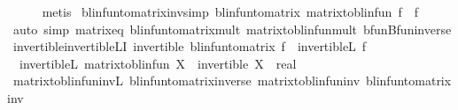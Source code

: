 \begin{isabellebody}
\ \ \ \ \isamarkupfalse%
\ metis\isanewline
{}\isamarkupfalse%
%
\endisatagproof
{\isafoldproof}%
%
\isadelimproof
\isanewline
%
\endisadelimproof
\isanewline
{}\isamarkupfalse%
\ blinfun{\isacharunderscore}{\kern0pt}to{\isacharunderscore}{\kern0pt}matrix{\isacharunderscore}{\kern0pt}inv{\isacharbrackleft}{\kern0pt}simp{\isacharbrackright}{\kern0pt}{\isacharcolon}{\kern0pt}\ {\isachardoublequoteopen}blinfun{\isacharunderscore}{\kern0pt}to{\isacharunderscore}{\kern0pt}matrix\ {\isacharparenleft}{\kern0pt}matrix{\isacharunderscore}{\kern0pt}to{\isacharunderscore}{\kern0pt}blinfun\ f{\isacharparenright}{\kern0pt}\ {\isacharequal}{\kern0pt}\ f{\isachardoublequoteclose}\isanewline
%
\isadelimproof
\ \ %
\endisadelimproof
%
\isatagproof
{}\isamarkupfalse%
\ {\isacharparenleft}{\kern0pt}auto\ simp{\isacharcolon}{\kern0pt}\ matrix{\isacharunderscore}{\kern0pt}eq\ blinfun{\isacharunderscore}{\kern0pt}to{\isacharunderscore}{\kern0pt}matrix{\isacharunderscore}{\kern0pt}mult{\isacharprime}{\kern0pt}{\isacharprime}{\kern0pt}\ matrix{\isacharunderscore}{\kern0pt}to{\isacharunderscore}{\kern0pt}blinfun{\isacharunderscore}{\kern0pt}mult\ bfun{\isachardot}{\kern0pt}Bfun{\isacharunderscore}{\kern0pt}inverse{\isacharparenright}{\kern0pt}%
\endisatagproof
{\isafoldproof}%
%
\isadelimproof
\isanewline
%
\endisadelimproof
\isanewline
{}\isamarkupfalse%
\ invertible{\isacharunderscore}{\kern0pt}invertible\isactrlsub L{\isacharunderscore}{\kern0pt}I{\isacharcolon}{\kern0pt}\ {\isachardoublequoteopen}invertible\ {\isacharparenleft}{\kern0pt}blinfun{\isacharunderscore}{\kern0pt}to{\isacharunderscore}{\kern0pt}matrix\ f{\isacharparenright}{\kern0pt}\ {\isasymLongrightarrow}\ invertible\isactrlsub L\ f{\isachardoublequoteclose}\isanewline
\ \ {\isachardoublequoteopen}invertible\isactrlsub L\ {\isacharparenleft}{\kern0pt}matrix{\isacharunderscore}{\kern0pt}to{\isacharunderscore}{\kern0pt}blinfun\ X{\isacharparenright}{\kern0pt}\ {\isasymLongrightarrow}\ invertible\ {\isacharparenleft}{\kern0pt}X\ {\isacharcolon}{\kern0pt}{\isacharcolon}{\kern0pt}\ real{\isacharcircum}{\kern0pt}{\isacharunderscore}{\kern0pt}{\isacharcircum}{\kern0pt}{\isacharunderscore}{\kern0pt}{\isacharparenright}{\kern0pt}{\isachardoublequoteclose}\isanewline
%
\isadelimproof
\ \ %
\endisadelimproof
%
\isatagproof
{}\isamarkupfalse%
\ matrix{\isacharunderscore}{\kern0pt}to{\isacharunderscore}{\kern0pt}blinfun{\isacharunderscore}{\kern0pt}inv\isactrlsub L{\isacharparenleft}{\kern0pt}{}{\isacharparenright}{\kern0pt}\ blinfun{\isacharunderscore}{\kern0pt}to{\isacharunderscore}{\kern0pt}matrix{\isacharunderscore}{\kern0pt}inverse{\isacharparenleft}{\kern0pt}{}{\isacharparenright}{\kern0pt}\ matrix{\isacharunderscore}{\kern0pt}to{\isacharunderscore}{\kern0pt}blinfun{\isacharunderscore}{\kern0pt}inv\ blinfun{\isacharunderscore}{\kern0pt}to{\isacharunderscore}{\kern0pt}matrix{\isacharunderscore}{\kern0pt}inv\ \isanewline

\end{isabellebody}
